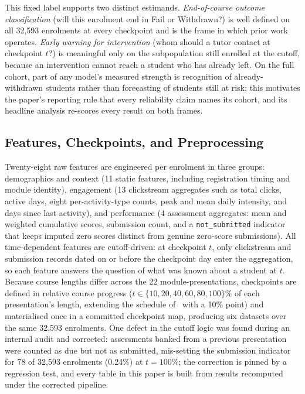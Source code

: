 \documentclass[conference]{IEEEtran}
\begin{document}
This fixed label supports two distinct estimands. \emph{End-of-course
outcome classification} (will this enrolment end in Fail or Withdrawn?) is
well defined on all 32,593 enrolments at every checkpoint and is the frame
in which prior work operates. \emph{Early warning for intervention} (whom
should a tutor contact at checkpoint $t$?) is meaningful only on the
subpopulation still enrolled at the cutoff, because an intervention cannot
reach a student who has already left. On the full cohort, part of any
model's measured strength is recognition of already-withdrawn students
rather than forecasting of students still at risk; this motivates the
paper's reporting rule that every reliability claim names its cohort, and
its headline analysis re-scores every result on both frames.

\subsection{Features, Checkpoints, and Preprocessing}

Twenty-eight raw features are engineered per enrolment in three groups:
demographics and context (11 static features, including registration timing
and module identity), engagement (13 clickstream aggregates such as total
clicks, active days, eight per-activity-type counts, peak and mean daily
intensity, and days since last activity), and performance (4 assessment
aggregates: mean and weighted cumulative scores, submission count, and a
\texttt{not\_submitted} indicator that keeps imputed zero scores distinct
from genuine zero-score submissions). All time-dependent features are
cutoff-driven: at checkpoint $t$, only clickstream and submission records
dated on or before the checkpoint day enter the aggregation, so each
feature answers the question of what was known about a student at $t$.
Because course lengths differ across the 22 module-presentations,
checkpoints are defined in relative course progress ($t \in \{10, 20, 40,
60, 80, 100\}\%$ of each presentation's length, extending the schedule
of~\cite{adnan2021} with a 10\% point) and materialised once in a committed
checkpoint map, producing six datasets over the same 32,593 enrolments. One
defect in the cutoff logic was found during an internal audit and corrected:
assessments banked from a previous presentation were counted as due but not
as submitted, mis-setting the submission indicator for 78 of 32,593
enrolments (0.24\%) at $t=100\%$; the correction is pinned by a regression
test, and every table in this paper is built from results recomputed under
the corrected pipeline.
\end{document}
